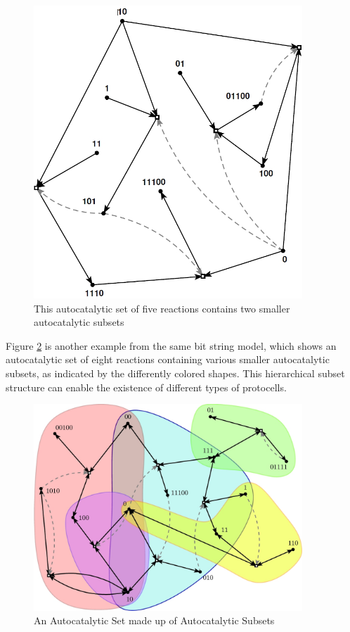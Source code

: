 \documentclass[]{article}
\begin{document}
\begin{figure}[H]
	\caption[Autocatalytic set 	with two smaller autocatalytic subsets]{This autocatalytic set of five reactions
		contains two smaller
		autocatalytic subsets\cite{hordijk2012structure}}\label{fig:AutoCatalytic2}
	\includegraphics[width=0.9\textwidth]{AutoCatalytic2}
\end{figure}

Figure \ref{fig:AutoCatalyticSubsets} is another example
from the same bit string model,
which shows an autocatalytic set
of eight reactions
containing various smaller
autocatalytic subsets,
as indicated by the differently
colored shapes.
This hierarchical subset structure
can enable the existence
of different types of protocells.

\begin{figure}[H]
	\caption[An Autocatalytic Set made up of Autocatalytic Subsets]{An Autocatalytic Set made up of Autocatalytic Subsets\cite{hordijk2017chasing}}\label{fig:AutoCatalyticSubsets}
	\includegraphics[width=0.9\textwidth]{AutoCatalyticSubsets}
\end{figure}
\end{document}
